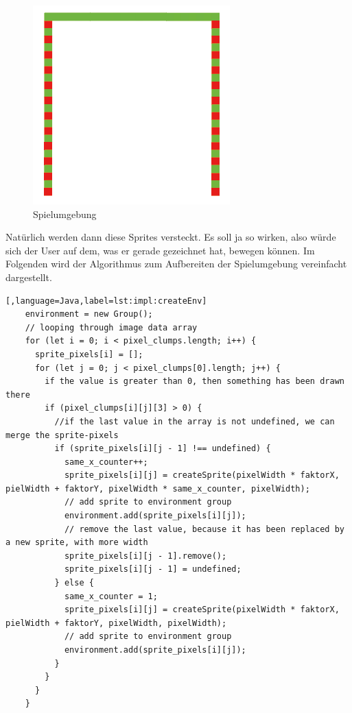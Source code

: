 \begin{figure}[H]
    \centering
    \includegraphics[scale=0.75]{pics/simpleDrawing3.PNG}
    \caption{Spielumgebung}
\end{figure}

Natürlich werden dann diese Sprites versteckt. Es soll ja so wirken, also würde sich der User auf dem, was er gerade gezeichnet hat, bewegen können.
Im Folgenden wird der Algorithmus zum Aufbereiten der Spielumgebung vereinfacht dargestellt.
\begin{lstlisting}[,language=Java,label=lst:impl:createEnv]
    environment = new Group();
    // looping through image data array
    for (let i = 0; i < pixel_clumps.length; i++) {
      sprite_pixels[i] = [];
      for (let j = 0; j < pixel_clumps[0].length; j++) {
        if the value is greater than 0, then something has been drawn there
        if (pixel_clumps[i][j][3] > 0) {
          //if the last value in the array is not undefined, we can merge the sprite-pixels
          if (sprite_pixels[i][j - 1] !== undefined) {
            same_x_counter++;
            sprite_pixels[i][j] = createSprite(pixelWidth * faktorX, pielWidth + faktorY, pixelWidth * same_x_counter, pixelWidth);
            // add sprite to environment group
            environment.add(sprite_pixels[i][j]);
            // remove the last value, because it has been replaced by a new sprite, with more width
            sprite_pixels[i][j - 1].remove();
            sprite_pixels[i][j - 1] = undefined;
          } else {
            same_x_counter = 1;
            sprite_pixels[i][j] = createSprite(pixelWidth * faktorX, pielWidth + faktorY, pixelWidth, pixelWidth); 
            // add sprite to environment group
            environment.add(sprite_pixels[i][j]);
          }
        }
      }
    }
\end{lstlisting}

